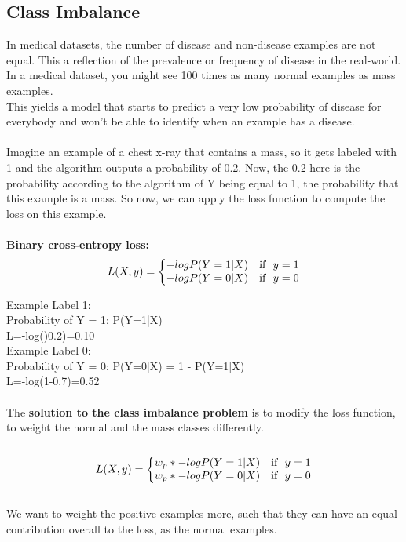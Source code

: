 \documentclass[a4paper,12pt]{article}
\begin{document}
\subsection{Class Imbalance}
In medical datasets, the number of disease and non-disease examples are not equal. This a reflection of the prevalence or frequency of disease in the real-world. In a medical dataset, you might see 100 times as many normal examples as mass examples.\\
This yields a model that starts to predict a very low probability of disease for everybody and won't be able to identify when an example has a disease.\\
\\
Imagine an example of a chest x-ray that contains a mass, so it gets labeled with 1 and the algorithm outputs a probability of 0.2. Now, the 0.2 here is the probability according to the algorithm of Y being equal to 1, the probability that this example is a mass. So now, we can apply the loss function to compute the loss on this example.
\\\\
\textbf{Binary cross-entropy loss:}
\begin{equation}
L(X,y)=\left\{
\begin{array}{@{}ll@{}}
-log P(Y=1|X) & \text{if}\ \ y=1 \nonumber \\
-log P(Y=0|X) & \text{if}\ \ y=0
\end{array}\right.
\end{equation} 

Example Label 1:\\
Probability of Y = 1: P(Y=1|X)\\
L=-log()0.2)=0.10\\

Example Label 0:\\
Probability of Y = 0: P(Y=0|X) = 1 - P(Y=1|X)\\
L=-log(1-0.7)=0.52
\\
\\
The \textbf{solution to the class imbalance problem} is to modify the loss function, to weight the normal and the mass classes differently. 
\\\\
\begin{equation}
L(X,y)=\left\{
\begin{array}{@{}ll@{}}
w_p * -log P(Y=1|X) & \text{if}\ \ y=1 \nonumber \\
w_p * -log P(Y=0|X) & \text{if}\ \ y=0
\end{array}\right.
\end{equation}
\\
We want to weight the positive examples more, such that they can have an equal contribution overall to the loss, as the normal examples.
\end{document}
